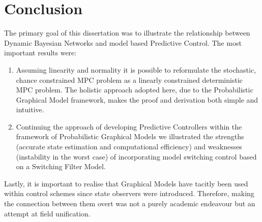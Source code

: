 \section{Conclusion}
The primary goal of this dissertation was to illustrate the relationship between Dynamic Bayesian Networks and model based Predictive Control. The most important results were:
\begin{enumerate}
\item
Assuming linearity and normality it is possible to reformulate the stochastic, chance constrained MPC problem as a linearly constrained deterministic MPC problem. The holistic approach adopted here, due to the Probabilistic Graphical Model framework, makes the proof and derivation both simple and intuitive.
\item
Continuing the approach of developing Predictive Controllers within the framework of Probabilistic Graphical Models we illustrated the strengths (accurate state estimation and computational efficiency) and weaknesses (instability in the worst case) of incorporating model switching control based on a Switching Filter Model.
\end{enumerate} 
Lastly, it is important to realise that Graphical Models have tacitly been used within control schemes since state observers were introduced. Therefore, making the connection between them overt was not a purely academic endeavour but an attempt at field unification.